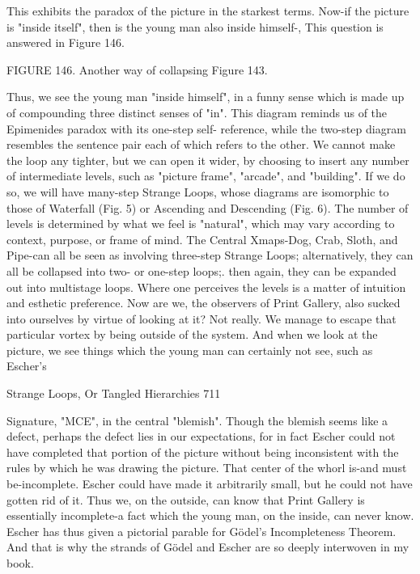 This exhibits the paradox of the picture in the starkest terms. Now-if the picture is "inside
itself", then is the young man also inside himself-, This question is answered in Figure
146.




                  FIGURE 146. Another way of collapsing Figure 143.

Thus, we see the young man "inside himself", in a funny sense which is made up of
compounding three distinct senses of "in".
        This diagram reminds us of the Epimenides paradox with its one-step self-
reference, while the two-step diagram resembles the sentence pair each of which refers to
the other. We cannot make the loop any tighter, but we can open it wider, by choosing to
insert any number of intermediate levels, such as "picture frame", "arcade", and
"building". If we do so, we will have many-step Strange Loops, whose diagrams are
isomorphic to those of Waterfall (Fig. 5) or Ascending and Descending (Fig. 6). The
number of levels is determined by what we feel is "natural", which may vary according to
context, purpose, or frame of mind. The Central Xmaps-Dog, Crab, Sloth, and Pipe-can
all be seen as involving three-step Strange Loops; alternatively, they can all be collapsed
into two- or one-step loops;. then again, they can be expanded out into multistage loops.
Where one perceives the levels is a matter of intuition and esthetic preference.
        Now are we, the observers of Print Gallery, also sucked into ourselves by virtue
of looking at it? Not really. We manage to escape that particular vortex by being outside
of the system. And when we look at the picture, we see things which the young man can
certainly not see, such as Escher's


Strange Loops, Or Tangled Hierarchies                                                    711

Signature, "MCE", in the central "blemish". Though the blemish seems like a defect,
perhaps the defect lies in our expectations, for in fact Escher could not have completed
that portion of the picture without being inconsistent with the rules by which he was
drawing the picture. That center of the whorl is-and must be-incomplete. Escher could
have made it arbitrarily small, but he could not have gotten rid of it. Thus we, on the
outside, can know that Print Gallery is essentially incomplete-a fact which the young
man, on the inside, can never know. Escher has thus given a pictorial parable for Gödel’s
Incompleteness Theorem. And that is why the strands of Gödel and Escher are so deeply
interwoven in my book.

